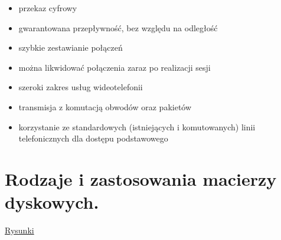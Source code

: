 \documentclass[12pt,a4paper]{article}
\begin{document}
	\begin{itemize}
		\item przekaz cyfrowy
		\item gwarantowana przepływność, bez względu na odległość
		\item szybkie zestawianie połączeń
		\item można likwidować połączenia zaraz po realizacji sesji
		\item szeroki zakres usług wideotelefonii
		\item transmisja z komutacją obwodów oraz pakietów
		\item korzystanie ze standardowych (istniejących i komutowanych) linii telefonicznych dla dostępu podstawowego
	\end{itemize}

	\section{Rodzaje i zastosowania macierzy dyskowych.}
	\href{https://poradnik.kz1.pl/index.php?page=macierzeraid}{Rysunki}
\end{document}
